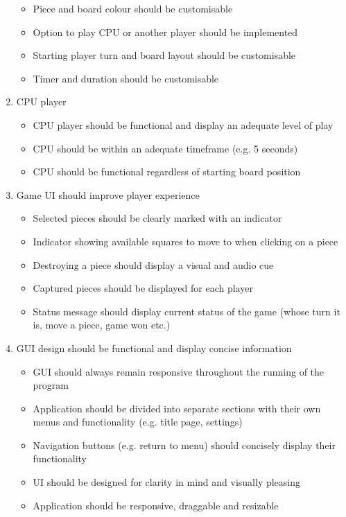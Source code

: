 \documentclass[../main/main.tex]{subfiles}
\begin{document}
\begin{enumerate}
    \begin{itemize}
    \item Piece and board colour should be customisable
    \item Option to play CPU or another player should be implemented
    \item Starting player turn and board layout should be customisable
    \item Timer and duration should be customisable
    \end{itemize}
\item CPU player
    \begin{itemize}
    \item CPU player should be functional and display an adequate level of play
    \item CPU should be within an adequate timeframe (e.g. 5 seconds)
    \item CPU should be functional regardless of starting board position
    \end{itemize}
\item Game UI should improve player experience
    \begin{itemize}
    \item Selected pieces should be clearly marked with an indicator
    \item Indicator showing available squares to move to when clicking on a piece
    \item Destroying a piece should display a visual and audio cue
    \item Captured pieces should be displayed for each player
    \item Status message should display current status of the game (whose turn it is, move a piece, game won etc.)
    \end{itemize}
\item GUI design should be functional and display concise information
    \begin{itemize}
    \item \label{itm:responsive-objective} GUI should always remain responsive throughout the running of the program
    \item Application should be divided into separate sections with their own menus and functionality (e.g. title page, settings)
    \item Navigation buttons (e.g. return to menu) should concisely display their functionality
    \item UI should be designed for clarity in mind and visually pleasing
    \item Application should be responsive, draggable and resizable
    \end{itemize}
\end{enumerate}
\end{document}
